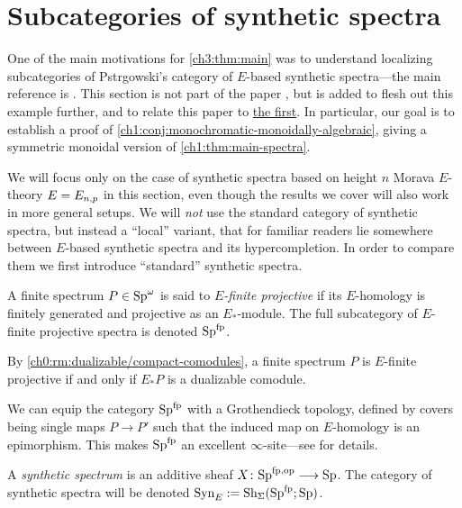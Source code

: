 
\section{Subcategories of synthetic spectra}
\label{ch3:addendum}

One of the main motivations for \cref{ch3:thm:main} was to understand localizing subcategories of Pstr\a{}gowski's category of $E$-based synthetic spectra---the main reference is \cite{pstragowski_2022}. This section is not part of the paper \cite{aambo_2024_localizing}, but is added to flesh out this example further, and to relate this paper to \hyperref[ch1]{the first}. In particular, our goal is to establish a proof of \cref{ch1:conj:monochromatic-monoidally-algebraic}, giving a symmetric monoidal version of \cref{ch1:thm:main-spectra}. 

We will focus only on the case of synthetic spectra based on height $n$ Morava $E$-theory $E=E_{n,p}$ in this section, even though the results we cover will also work in more general setups. We will \emph{not} use the standard category of synthetic spectra, but instead a ``local'' variant, that for familiar readers lie somewhere between $E$-based synthetic spectra and its hypercompletion. In order to compare them we first introduce ``standard'' synthetic spectra. 

\begin{definition}
    A finite spectrum $P\in \mathrm{Sp}^\omega$ is said to \emph{$E$-finite projective} if its $E$-homology is finitely generated and projective as an $E_{*}$-module. The full subcategory of $E$-finite projective spectra is denoted $\mathrm{Sp}^{\mathrm{fp}}$. 
\end{definition}

\begin{remark}
    By \cref{ch0:rm:dualizable/compact-comodules}, a finite spectrum $P$ is $E$-finite projective if and only if $E_{*}P$ is a dualizable comodule. 
\end{remark}

We can equip the category $\mathrm{Sp}^{\mathrm{fp}}$ with a Grothendieck topology, defined by covers being single maps $P\to P'$ such that the induced map on $E$-homology is an epimorphism. This makes $\mathrm{Sp}^{\mathrm{fp}}$ an excellent $\infty$-site---see \cite[Section 2.3]{pstragowski_2022} for details. 

\begin{definition}
    A \emph{synthetic spectrum} is an additive sheaf $X\colon \mathrm{Sp}^{\mathrm{fp}, \mathrm{op}}\longrightarrow \mathrm{Sp}$. The category of synthetic spectra will be denoted $\mathrm{Syn}_{E} := \mathrm{Sh}_\Sigma(\mathrm{Sp}^{\mathrm{fp}};\mathrm{Sp})$. 
\end{definition}

